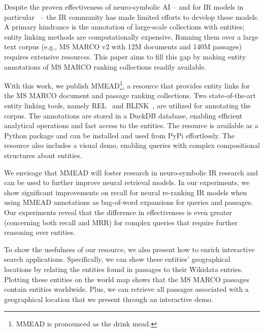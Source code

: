 Despite the proven effectiveness of neuro-symbolic AI -- and for IR models in particular~\citep{Tran:2022:DRE, Gerritse:2022:EMBERT, chatterjee2022bert} -- the IR community has made limited efforts to develop these models. A primary hindrance is the annotation of large-scale collections with entities; entity linking methods are computationally expensive. Running them over a large text corpus (e.g., MS MARCO v2 with 12M documents and 140M passages) requires extensive resources. This paper aims to fill this gap by making entity annotations of MS MARCO ranking collections readily available.

With this work, we publish MMEAD\footnote{MMEAD is pronounced as the drink mead.}, a resource that provides entity links for the MS MARCO document and passage ranking collections. Two state-of-the-art entity linking tools, namely REL~\citep{REL, rebl} and BLINK~\citep{blink}, are utilized for annotating the corpus. The annotations are stored in a DuckDB database, enabling efficient analytical operations and fast access to the entities. The resource is available as a Python package and can be installed and used from PyPi effortlessly. The resource also includes a visual demo, enabling queries with complex compositional structures about entities. 

We envisage that MMEAD will foster research in neuro-symbolic IR research and can be used to further improve neural retrieval models. In our experiments, we show significant improvements on recall for neural re-ranking IR models when using MMEAD annotations as bag-of-word expansions for queries and passages. Our experiments reveal that the difference in effectiveness is even greater (concerning both recall and MRR) for complex queries that require further reasoning over entities.

To show the usefulness of our resource, we also present how to enrich interactive search applications. Specifically, we can show these entities' geographical locations by relating the entities found in passages to their Wikidata entries. Plotting these entities on the world map shows that the MS MARCO passages contain entities worldwide.
Plus, we can retrieve all passages associated with a geographical location that we present through an interactive demo.  


